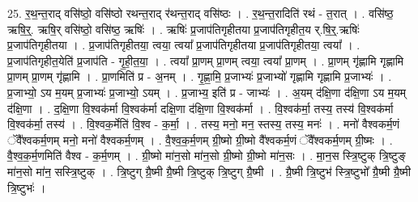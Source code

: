 \documentclass[17pt]{extarticle}
\begin{document}
25. र॒थ॒न्त॒राद् वसि॑ष्ठो॒ वसि॑ष्ठो रथन्त॒राद् र॑थन्त॒राद् वसि॑ष्ठः । . र॒थ॒न्त॒रादिति॑ रथं - त॒रात् । . वसि॑ष्ठ॒ ऋषि॒र्॒. ऋषि॒र् वसि॑ष्ठो॒ वसि॑ष्ठ॒ ऋषिः॑ । . ऋषिः॑ प्र॒जाप॑तिगृहीतया प्र॒जाप॑तिगृहीत॒य र्.षि॒र्॒.ऋषिः॑ प्र॒जाप॑तिगृहीतया । . प्र॒जाप॑तिगृहीतया॒ त्वया॒ त्वया᳚ प्र॒जाप॑तिगृहीतया प्र॒जाप॑तिगृहीतया॒ त्वया᳚ । . प्र॒जाप॑तिगृहीत॒येति॑ प्र॒जाप॑ति - गृ॒ही॒त॒या॒ । . त्वया᳚ प्रा॒णम् प्रा॒णम् त्वया॒ त्वया᳚ प्रा॒णम् । . प्रा॒णम् गृ॑ह्णामि गृह्णामि प्रा॒णम् प्रा॒णम् गृ॑ह्णामि । . प्रा॒णमिति॑ प्र - अ॒नम् । . गृ॒ह्णा॒मि॒ प्र॒जाभ्यः॑ प्र॒जाभ्यो॑ गृह्णामि गृह्णामि प्र॒जाभ्यः॑ । . प्र॒जाभ्यो॒ ऽय म॒यम् प्र॒जाभ्यः॑ प्र॒जाभ्यो॒ ऽयम् । . प्र॒जाभ्य॒ इति॑ प्र - जाभ्यः॑ । . अ॒यम् द॑क्षि॒णा द॑क्षि॒णा ऽय म॒यम् द॑क्षि॒णा । . द॒क्षि॒णा वि॒श्वक॑र्मा वि॒श्वक॑र्मा दक्षि॒णा द॑क्षि॒णा वि॒श्वक॑र्मा । . वि॒श्वक॑र्मा॒ तस्य॒ तस्य॑ वि॒श्वक॑र्मा वि॒श्वक॑र्मा॒ तस्य॑ । . वि॒श्वक॒र्मेति॑ वि॒श्व - क॒र्मा॒ । . तस्य॒ मनो॒ मन॒ स्तस्य॒ तस्य॒ मनः॑ । . मनो॑ वैश्वकर्म॒णं ॅवै᳚श्वकर्म॒णम् मनो॒ मनो॑ वैश्वकर्म॒णम् । . वै॒श्व॒क॒र्म॒णम् ग्री॒ष्मो ग्री॒ष्मो वै᳚श्वकर्म॒णं ॅवै᳚श्वकर्म॒णम् ग्री॒ष्मः । . वै॒श्व॒क॒र्म॒णमिति॑ वैश्व - क॒र्म॒णम् । . ग्री॒ष्मो मा॑न॒सो मा॑न॒सो ग्री॒ष्मो ग्री॒ष्मो मा॑न॒सः । . मा॒न॒स स्त्रि॒ष्टुक् त्रि॒ष्टुङ् मा॑न॒सो मा॑न॒ सस्त्रि॒ष्टुक् । . त्रि॒ष्टुग् ग्रै॒ष्मी ग्रै॒ष्मी त्रि॒ष्टुक् त्रि॒ष्टुग् ग्रै॒ष्मी । . ग्रै॒ष्मी त्रि॒ष्टुभ॑ स्त्रि॒ष्टुभो᳚ ग्रै॒ष्मी ग्रै॒ष्मी त्रि॒ष्टुभः॑ । \newline
\end{document}

